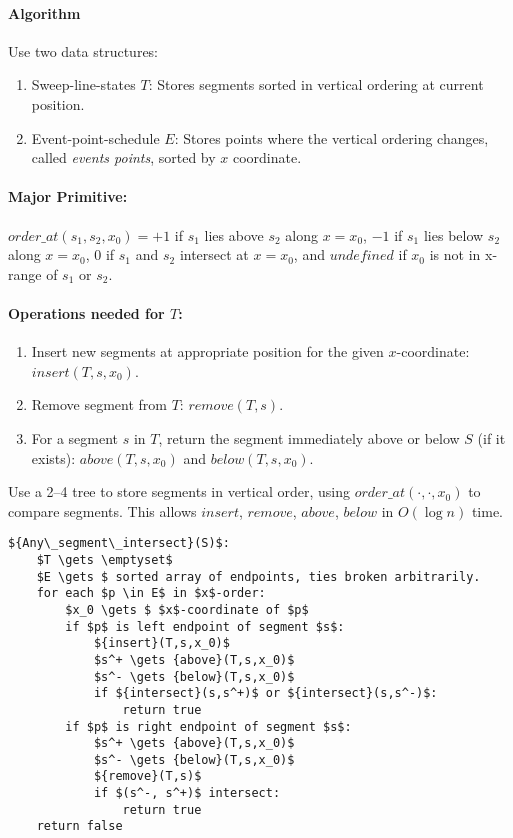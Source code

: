 \paragraph{Algorithm} Use two data structures:
\begin{enumerate}
	\item Sweep-line-states $T$: Stores segments sorted in vertical ordering at current position.
	\item Event-point-schedule $E$: Stores points where the vertical ordering changes, called \emph{events points}, sorted by $x$ coordinate.
\end{enumerate}

\paragraph{Major Primitive:}

${order\_at}(s_1, s_2, x_0) = +1$ if $s_1$ lies above $s_2$ along $x=x_0$, $-1$ if $s_1$ lies below $s_2$ along $x=x_0$, $0$ if $s_1$ and $s_2$ intersect at $x=x_0$, and ${undefined}$ if $x_0$ is not in x-range of $s_1$ or $s_2$.

\paragraph{Operations needed for $T$:}

\begin{enumerate}
	\item Insert new segments at appropriate position for the given $x$-coordinate: ${insert}(T,s,x_0)$.
	\item Remove segment from $T$: ${remove}(T,s)$.
	\item For a segment $s$ in $T$, return the segment immediately above or below $S$ (if it exists): ${above}(T,s,x_0)$ and ${below}(T,s,x_0)$.
\end{enumerate}

Use a 2--4 tree to store segments in vertical order, using ${order\_at(\cdot, \cdot, x_0)}$ to compare segments. This allows ${insert}$, ${remove}$, ${above}$, ${below}$ in $O(\log n)$ time.

\begin{lstlisting}[mathescape]
${Any\_segment\_intersect}(S)$:
	$T \gets \emptyset$
	$E \gets $ sorted array of endpoints, ties broken arbitrarily.
	for each $p \in E$ in $x$-order:
		$x_0 \gets $ $x$-coordinate of $p$
		if $p$ is left endpoint of segment $s$:
			${insert}(T,s,x_0)$
			$s^+ \gets {above}(T,s,x_0)$
			$s^- \gets {below}(T,s,x_0)$
			if ${intersect}(s,s^+)$ or ${intersect}(s,s^-)$:
				return true
		if $p$ is right endpoint of segment $s$:
			$s^+ \gets {above}(T,s,x_0)$
			$s^- \gets {below}(T,s,x_0)$
			${remove}(T,s)$
			if $(s^-, s^+)$ intersect:
				return true
	return false
\end{lstlisting}

